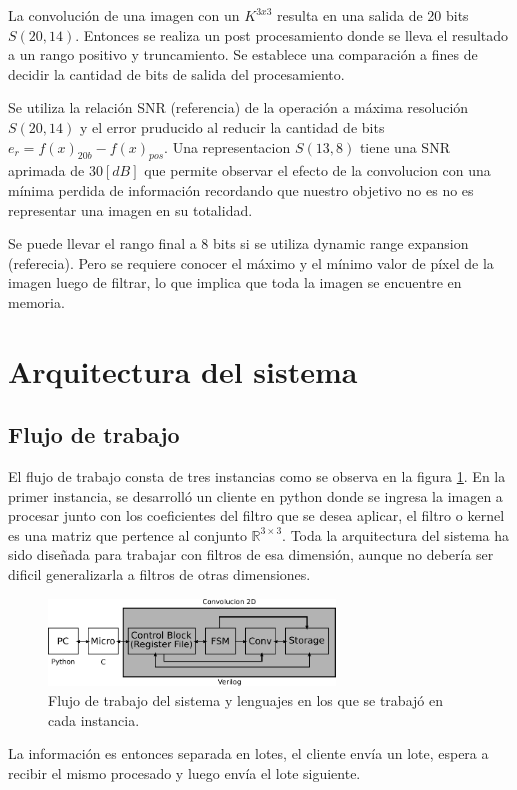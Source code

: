\documentclass[conference,compsoc]{IEEEtran}
\begin{document}
La convoluci\'on de una imagen con un \(K^{3x3}\) resulta en una salida de 20 bits \(S(20,14)\). Entonces se realiza un post procesamiento donde se lleva el
resultado a un rango positivo y truncamiento. Se establece una comparaci\'on a fines de decidir la cantidad de bits de salida del procesamiento. 

Se utiliza la relaci\'on SNR (referencia) de la operaci\'on a m\'axima resoluci\'on \(S(20,14)\) y el error pruducido al reducir la cantidad de bits \(e_r=f(x)_{20b}-f(x)_{pos}\). Una representacion \(S(13,8)\) tiene una SNR aprimada de \(30 [dB]\) que permite observar el efecto de la convolucion con una m\'inima perdida de informaci\'on recordando que nuestro objetivo no es no es representar una imagen en su totalidad.

Se puede llevar el rango final a 8 bits si se utiliza dynamic range expansion (referecia). Pero se requiere conocer el m\'aximo y el m\'inimo valor de p\'ixel de la imagen luego de filtrar, lo que implica que toda la imagen se encuentre en memoria.

\section{Arquitectura del sistema}

\subsection{Flujo de trabajo}
El flujo de trabajo consta de tres instancias como se observa en la figura
\ref{fig_workflow}. En la primer instancia, se desarroll\'o un cliente en python
donde se ingresa la imagen a procesar junto con los coeficientes del filtro que
se desea aplicar, el filtro o kernel es una matriz que pertence al conjunto
$\mathbb{R}^{3{\times}3}$. Toda la arquitectura del sistema ha sido dise\~nada
para trabajar con filtros de esa dimensi\'on, aunque no deber\'ia ser dificil
generalizarla a filtros de otras dimensiones.
\begin{figure}[!t]
\centering
\includegraphics[width=3in]{workflow.pdf}
\caption{Flujo de trabajo del sistema y lenguajes en los que se trabaj\'o en
  cada instancia.}
\label{fig_workflow}
\end{figure}
La informaci\'on es entonces separada en lotes, el cliente env\'ia un
lote, espera a recibir el mismo procesado y luego env\'ia el lote siguiente.
\end{document}
